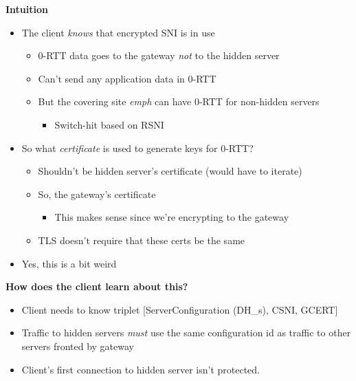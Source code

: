 \documentclass[helvetica]{seminar}
\newcommand{\heading}[1]{%
  \begin{center} 
    \large\bf 
    #1 
  \end{center} 
  \vspace{.4 in}}
\begin{document}
\begin{slide}
\heading{Intuition}

\vspace{-3ex}
\begin{itemize}
\item The client \emph{knows} that encrypted SNI is in use
  \begin{itemize}
  \item 0-RTT data goes to the gateway \emph{not} to the hidden server
  \item Can't send any application data in 0-RTT
  \item But the covering site \emph{emph} can have 0-RTT for non-hidden servers
    \begin{itemize}
    \item Switch-hit based on RSNI
    \end{itemize}
  \end{itemize}

\item So what \emph{certificate} is used to generate keys for 0-RTT?
  \begin{itemize}
  \item Shouldn't be hidden server's certificate (would have to iterate)
  \item So, the gateway's certificate
    \begin{itemize}
    \item This makes sense since we're encrypting to the gateway
    \end{itemize}
  \item TLS doesn't require that these certs be the same
  \end{itemize}

\item Yes, this is a bit weird
\end{itemize}
\end{slide}


\begin{slide}
\heading{How does the client learn about this?}

\begin{itemize}
\item Client needs to know triplet [ServerConfiguration (DH\_s), CSNI, GCERT]
\item Traffic to hidden servers \emph{must} use the same configuration id as traffic to other servers fronted by gateway
\item Client's first connection to hidden server isn't protected.
\end{itemize}
\end{slide}
\end{document}
